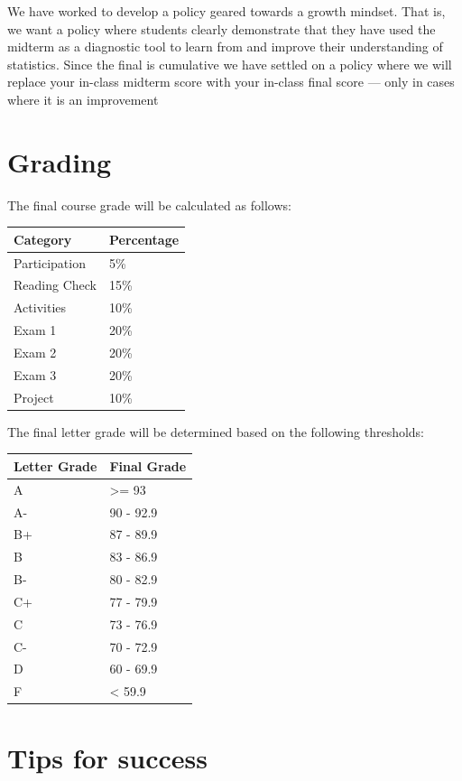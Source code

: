 \documentclass[
  letterpaper,
  DIV=11,
  numbers=noendperiod]{scrreprt}
\begin{document}
We have worked to develop a policy geared towards a growth mindset. That
is, we want a policy where students clearly demonstrate that they have
used the midterm as a diagnostic tool to learn from and improve their
understanding of statistics. Since the final is cumulative we have
settled on a policy where we will replace your in-class midterm score
with your in-class final score --- only in cases where it is an
improvement

\hypertarget{grading}{%
\section*{Grading}\label{grading}}

The final course grade will be calculated as follows:

\begin{longtable}[]{@{}ll@{}}
\toprule()
Category & Percentage \\
\midrule()
\endhead
Participation & 5\% \\
Reading Check & 15\% \\
Activities & 10\% \\
Exam 1 & 20\% \\
Exam 2 & 20\% \\
Exam 3 & 20\% \\
Project & 10\% \\
\bottomrule()
\end{longtable}

The final letter grade will be determined based on the following
thresholds:

\begin{longtable}[]{@{}ll@{}}
\toprule()
Letter Grade & Final Grade \\
\midrule()
\endhead
A & \textgreater= 93 \\
A- & 90 - 92.9 \\
B+ & 87 - 89.9 \\
B & 83 - 86.9 \\
B- & 80 - 82.9 \\
C+ & 77 - 79.9 \\
C & 73 - 76.9 \\
C- & 70 - 72.9 \\
D & 60 - 69.9 \\
F & \textless{} 59.9 \\
\bottomrule()
\end{longtable}

\hypertarget{tips-for-success}{%
\section*{Tips for success}\label{tips-for-success}}
\end{document}
